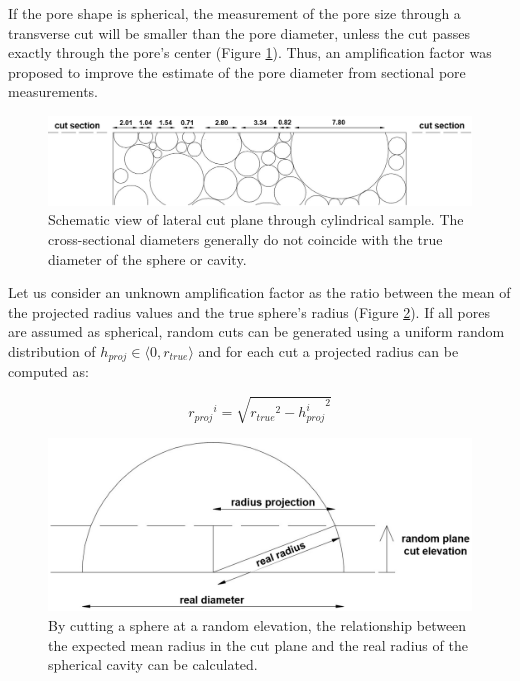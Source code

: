 \documentclass[review]{elsarticle}
\begin{document}
If the pore shape is spherical, the measurement of the pore size through a transverse cut will be smaller than the pore diameter, unless the cut passes exactly through the pore's center (Figure \ref{FoamCutPlane}). Thus, an amplification factor was proposed to improve the estimate of the pore diameter from sectional pore measurements.

\begin{figure}[htbp]
	\begin{center}
		\includegraphics[width=0.95\linewidth]{Tex-Figures/Fig04.png}
		\caption{Schematic view of lateral cut plane through cylindrical sample. The cross-sectional diameters generally do not coincide with the true diameter of the sphere or cavity.}
		\label{FoamCutPlane}
	\end{center}
\end{figure}

Let us consider an unknown amplification factor as the ratio between the mean of the projected radius values and the true sphere's radius (Figure \ref{RandomPlaneCut}). If all pores are assumed as spherical, random cuts can be generated using a uniform random distribution of $h_{proj} \in \langle 0,r_{true} \rangle$ and for each cut a projected radius can be computed as:

\begin{equation}\label{Eq11}
{r_{proj}}^i=\sqrt{{r_{true}}^2-{h_{proj}^i}^2}
\end{equation}

\begin{figure}[htbp]
	\begin{center}
		\includegraphics[width=0.75\linewidth]{Tex-Figures/Fig05.png}
		\caption{By cutting a sphere at a random elevation, the relationship between the expected mean radius in the cut plane and the real radius of the spherical cavity can be calculated.}
		\label{RandomPlaneCut}
	\end{center}
\end{figure}
\end{document}
